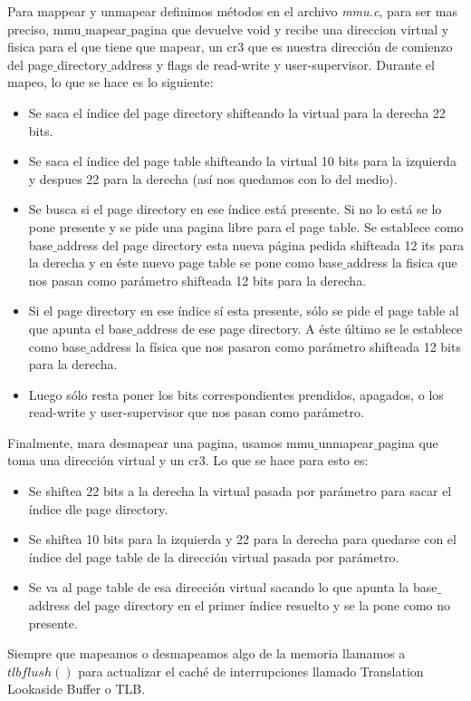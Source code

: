 Para mappear y unmapear definimos m\'etodos en el archivo \textit{mmu.c}, para ser mas preciso, mmu$\_$mapear$\_$pagina que devuelve void y recibe una direccion virtual y fisica para el que tiene que mapear, un cr3 que es nuestra dirección de comienzo del page$\_$directory$\_$address y flags de read-write y user-supervisor.
Durante el mapeo, lo que se hace es lo siguiente:
\begin{itemize}
    \item Se saca el índice del page directory shifteando la virtual para la derecha 22 bits.
    \item Se saca el índice del page table shifteando la virtual 10 bits para la izquierda y despues 22 para la derecha (así nos quedamos con lo del medio).
    \item Se busca si el page directory en ese índice está presente. Si no lo está se lo pone presente y se pide una pagina libre para el page table. Se establece como base$\_$address del page directory esta nueva página pedida shifteada 12 its para la derecha y en éste nuevo page table se pone como base$\_$address la fisica que nos pasan como parámetro shifteada 12 bits para la derecha.
    \item Si el page directory en ese índice sí esta presente, sólo se pide el page table al que apunta el base$\_$address de ese page directory. A éste último se le establece como base$\_$address la física que nos pasaron como parámetro shifteada 12 bits para la derecha.
    \item Luego sólo resta poner los bits correspondientes prendidos, apagados, o los read-write y user-supervisor que nos pasan como parámetro.
\end{itemize}

Finalmente, mara desmapear una pagina, usamos mmu$\_$unmapear$\_$pagina que toma una dirección virtual y un cr3. Lo que se hace para esto es:
\begin{itemize}
	\item Se shiftea 22 bits a la derecha la virtual pasada por parámetro para sacar el índice dle page directory.
	\item Se shiftea 10 bits para la izquierda y 22 para la derecha para quedarse con el índice del page table de la dirección virtual pasada por parámetro.
	\item Se va al page table de esa dirección virtual sacando lo que apunta la base$\_$address del page directory en el primer índice resuelto y se la pone como no presente.
\end{itemize}
Siempre que mapeamos o desmapeamos algo de la memoria llamamos a $tlbflush()$ para actualizar el caché de interrupciones llamado Translation Lookaside Buffer o TLB.

